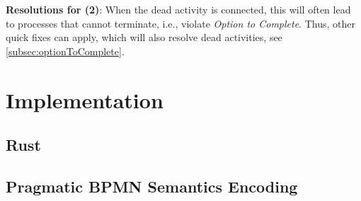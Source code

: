 \documentclass[runningheads]{llncs}
\begin{document}
\textbf{Resolutions for (2)}: When the dead activity is connected, this will often lead to processes that cannot terminate, i.e., violate \textit{Option to Complete}.
Thus, other quick fixes can apply, which will also resolve dead activities, see \autoref{subsec:optionToComplete}.

\section{Implementation}


\subsection{Rust}



\subsection{Pragmatic BPMN Semantics Encoding}
\end{document}
